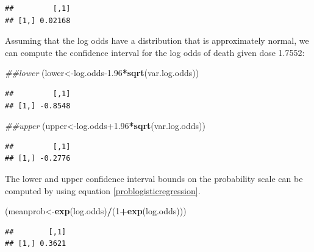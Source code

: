 \documentclass[12pt,]{krantz}
\newenvironment{Shaded}{\begin{snugshade}}{\end{snugshade}}
\newcommand{\CommentTok}[1]{\textcolor[rgb]{0.56,0.35,0.01}{\textit{#1}}}
\newcommand{\DecValTok}[1]{\textcolor[rgb]{0.00,0.00,0.81}{#1}}
\newcommand{\FloatTok}[1]{\textcolor[rgb]{0.00,0.00,0.81}{#1}}
\newcommand{\KeywordTok}[1]{\textcolor[rgb]{0.13,0.29,0.53}{\textbf{#1}}}
\newcommand{\NormalTok}[1]{#1}
\newcommand{\OperatorTok}[1]{\textcolor[rgb]{0.81,0.36,0.00}{\textbf{#1}}}
\begin{document}
\begin{Shaded}
\end{Shaded}

\begin{verbatim}
##         [,1]
## [1,] 0.02168
\end{verbatim}

Assuming that the log odds have a distribution that is approximately normal, we can compute the confidence interval for the log odds
of death given dose 1.7552:

\begin{Shaded}
\begin{Highlighting}[]
\CommentTok{##lower}
\NormalTok{(lower<-log.odds}\FloatTok{-1.96}\OperatorTok{*}\KeywordTok{sqrt}\NormalTok{(var.log.odds))}
\end{Highlighting}
\end{Shaded}

\begin{verbatim}
##         [,1]
## [1,] -0.8548
\end{verbatim}

\begin{Shaded}
\begin{Highlighting}[]
\CommentTok{##upper}
\NormalTok{(upper<-log.odds}\FloatTok{+1.96}\OperatorTok{*}\KeywordTok{sqrt}\NormalTok{(var.log.odds))}
\end{Highlighting}
\end{Shaded}

\begin{verbatim}
##         [,1]
## [1,] -0.2776
\end{verbatim}

The lower and upper confidence interval bounds on the
probability scale can be computed by
using equation \ref{problogisticregression}.

\begin{Shaded}
\begin{Highlighting}[]
\NormalTok{(meanprob<-}\KeywordTok{exp}\NormalTok{(log.odds)}\OperatorTok{/}\NormalTok{(}\DecValTok{1}\OperatorTok{+}\KeywordTok{exp}\NormalTok{(log.odds)))}
\end{Highlighting}
\end{Shaded}

\begin{verbatim}
##        [,1]
## [1,] 0.3621
\end{verbatim}
\end{document}
